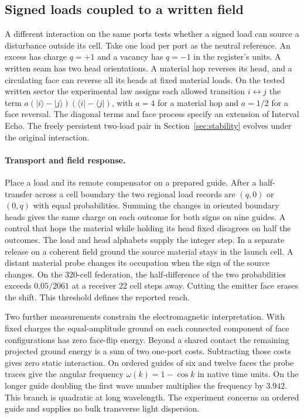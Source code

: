 \documentclass[11pt]{article}
\theoremstyle{definition}
\theoremstyle{remark}
\theoremstyle{plain}
\newcommand{\ket}[1]{\lvert #1\rangle}
\newcommand{\bra}[1]{\langle #1\rvert}
\begin{document}
\subsection{Signed loads coupled to a written field}
\label{sec:written-signed-load}

A different interaction on the same ports tests whether a signed load can
source a disturbance outside its cell. Take one load per port as the neutral
reference. An excess has charge $q=+1$ and a vacancy has $q=-1$ in the
register's units. A written seam has two head orientations. A material hop
reverses its head, and a circulating face can reverse all its heads at
fixed material loads. On the tested written sector the experimental law
assigns each allowed transition $i\leftrightarrow j$ the term
$a(\ket i-\ket j)(\bra i-\bra j)$, with $a=4$ for a material hop and
$a=1/2$ for a face reversal. The diagonal terms and face process specify
an extension of Interval Echo. The freely persistent two-load pair in
Section~\ref{sec:stability} evolves under the original interaction.

\paragraph{Transport and field response.}
Place a load and its remote compensator on a prepared guide. After a
half-transfer across a cell boundary the two regional load records are
$(q,0)$ or $(0,q)$ with equal probabilities. Summing the changes in
oriented boundary heads gives the same charge on each outcome for both
signs on nine guides. A control that hops the material while holding its
head fixed disagrees on half the outcomes. The load and head alphabets
supply the integer step. In a separate release on a coherent field ground
the source material stays in the launch cell. A distant material probe
changes its occupation when the sign of the source changes. On the
320-cell federation, the half-difference of the two probabilities exceeds
$0.05/2061$ at a receiver 22 cell steps away. Cutting the emitter face
erases the shift. This threshold defines the reported reach.

Two further measurements constrain the electromagnetic interpretation.
With fixed charges the equal-amplitude ground on each connected component
of face configurations has zero face-flip energy. Beyond a shared contact
the remaining projected ground energy is a sum of two one-port costs.
Subtracting those costs gives zero static interaction. On ordered guides
of six and twelve faces the probe traces give the angular frequency
$\omega(k)=1-\cos k$ in native time units. On the longer guide doubling
the first wave number multiplies the frequency by $3.942$. This branch
is quadratic at long wavelength. The experiment concerns an ordered
guide and supplies no bulk transverse light dispersion.
\end{document}
